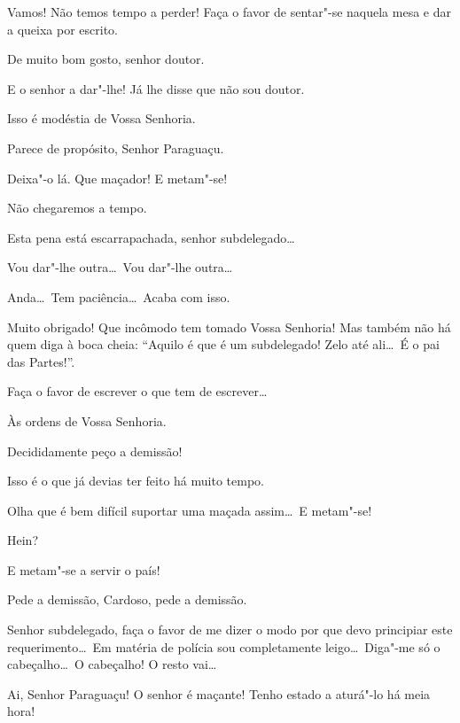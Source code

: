  Vamos! Não temos tempo a perder! Faça o favor de sentar"-se
naquela mesa e dar a queixa por
escrito.

 De muito bom gosto, senhor doutor. 

 E o senhor a dar"-lhe! Já lhe disse que não sou doutor.

 Isso é modéstia de Vossa Senhoria.

 Parece de propósito, Senhor Paraguaçu.

 Deixa"-o lá.  Que
maçador! E metam"-se!

 Não chegaremos a tempo.

  Esta pena está escarrapachada, senhor
subdelegado\ldots

 Vou dar"-lhe outra\ldots\ Vou dar"-lhe outra\ldots

 Anda\ldots\ Tem paciência\ldots\ Acaba com isso. 

 Muito obrigado! Que incômodo tem tomado Vossa Senhoria! Mas
também não há quem diga à
boca cheia: “Aquilo é que é um subdelegado! Zelo até ali\ldots\ É o pai das
Partes!”.

 Faça o favor de escrever o que tem de escrever\ldots

 Às ordens de Vossa Senhoria. 

  Decididamente peço
a demissão!

 Isso é o que já devias ter feito há muito tempo.

 Olha que é bem difícil suportar uma maçada assim\ldots\ E
metam"-se!

 Hein?

 E metam"-se a servir o país!

 Pede a demissão, Cardoso, pede a demissão.

  Senhor subdelegado, faça o favor de
me dizer o modo por que devo principiar este
requerimento\ldots\ Em matéria de polícia sou completamente leigo\ldots\ Diga"-me
só o cabeçalho\ldots\ O cabeçalho!
O resto vai\ldots

 Ai, Senhor Paraguaçu! O senhor é maçante! Tenho estado a
aturá"-lo há meia hora!

